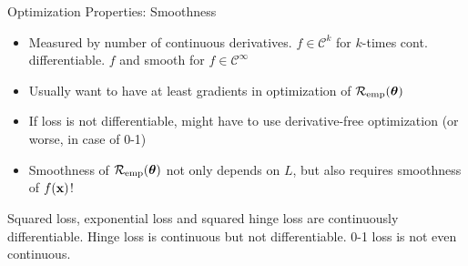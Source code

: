 \documentclass[11pt,compress,t,notes=noshow, xcolor=table]{beamer}
\begin{document}
\begin{frame}{Optimization Properties: Smoothness}


\begin{itemize}
\item Measured by number of continuous derivatives. $f \in \mathcal{C}^k$ for $k$-times cont. differentiable. $f$ and smooth for $f \in \mathcal{C}^{\infty}$
\item Usually want to have at least gradients in optimization of $\mathcal{R}_{\text{emp}}(\bm{\theta})$
\item If loss is not differentiable, might have to use derivative-free optimization (or worse, in case of 0-1)
\item Smoothness of $\mathcal{R}_{\text{emp}}(\bm{\theta})$ not only depends on $L$, but also requires smoothness of $f(\mathbf{x})$! 
\end{itemize}

\vfill

%
{
  \raggedright {\footnotesize
  Squared loss, exponential loss and squared hinge loss are continuously 
  differentiable. Hinge loss is continuous but not differentiable. 
  0-1 loss is not even continuous.}
}%






\end{frame}
\end{document}
